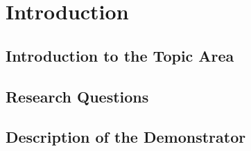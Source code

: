 \chapter{Introduction}
\label{cha:introduction}


\section{Introduction to the Topic Area}


\section{Research Questions}



\section{Description of the Demonstrator}

